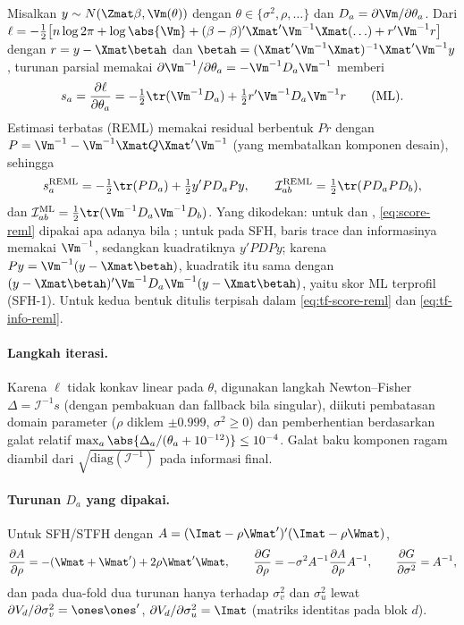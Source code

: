 Misalkan $y\sim N(\Zmat\beta,\Vm(\theta))$ dengan
$\theta\in\{\sigma^2,\rho,\ldots\}$ dan
$D_a=\partial\Vm/\partial\theta_a$. Dari
$\ell=-\tfrac12\bigl[n\log2\pi+\log\abs{\Vm}
+(\beta-\beta)'\Xmat'\Vm^{-1}\Xmat(\ldots)+r'\Vm^{-1}r\bigr]$ dengan
$r=y-\Xmat\betah$ dan
$\betah=(\Xmat'\Vm^{-1}\Xmat)^{-1}\Xmat'\Vm^{-1}y$, turunan parsial memakai
$\partial\Vm^{-1}/\partial\theta_a=-\Vm^{-1}D_a\Vm^{-1}$ memberi
\begin{equation}
  s_a=\frac{\partial\ell}{\partial\theta_a}
  =-\tfrac12\tr(\Vm^{-1}D_a)+\tfrac12 r'\Vm^{-1}D_a\Vm^{-1}r
  \qquad\text{(ML)}.
  \label{eq:score-ml}
\end{equation}
Estimasi terbatas (REML) memakai residual berbentuk
$P r$ dengan $P=\Vm^{-1}-\Vm^{-1}\Xmat Q\Xmat'\Vm^{-1}$ (yang membatalkan
komponen desain), sehingga
\begin{equation}
  s_a^{\text{REML}}
  =-\tfrac12\tr(P D_a)+\tfrac12 y'P D_a P y,
  \qquad
  \mathcal I_{ab}^{\text{REML}}=\tfrac12\tr(P D_a P D_b),
  \label{eq:score-reml}
\end{equation}
dan $\mathcal I_{ab}^{\text{ML}}=\tfrac12\tr(\Vm^{-1}D_a\Vm^{-1}D_b)$.
Yang dikodekan: untuk  dan ,
\eqref{eq:score-reml} dipakai apa adanya bila ;
untuk  pada SFH, baris trace dan informasinya memakai
$\Vm^{-1}$, sedangkan kuadratiknya $y'PDPy$; karena $Py=\Vm^{-1}(y-\Xmat\betah)$,
kuadratik itu sama dengan $(y-\Xmat\betah)'\Vm^{-1}D_a\Vm^{-1}(y-\Xmat\betah)$, yaitu skor
ML terprofil (SFH-1). Untuk  kedua bentuk ditulis
terpisah dalam \eqref{eq:tf-score-reml} dan \eqref{eq:tf-info-reml}.

\paragraph{Langkah iterasi.} Karena $\ell$ tidak konkav linear pada
$\theta$, digunakan langkah Newton--Fisher
$\Delta=\mathcal I^{-1}s$ (dengan pembakuan  dan fallback
 bila singular), diikuti pembatasan domain parameter
($\rho$ diklem $\pm0.999$, $\sigma^2\ge0$) dan pemberhentian berdasarkan
galat relatif $\max_a\abs{\Delta_a/(\theta_a+10^{-12})}\le10^{-4}$.
Galat baku komponen ragam diambil dari $\sqrt{\mathrm{diag}(\mathcal I^{-1})}$
pada informasi final.

\paragraph{Turunan $D_a$ yang dipakai.} Untuk SFH/STFH dengan
$A=(\Imat-\rho\Wmat')'(\Imat-\rho\Wmat)$,
\begin{equation}
  \frac{\partial A}{\partial\rho}=-(\Wmat+\Wmat')+2\rho\Wmat'\Wmat,
  \qquad
  \frac{\partial G}{\partial\rho}
  =-\sigma^2A^{-1}\frac{\partial A}{\partial\rho}A^{-1},
  \qquad
  \frac{\partial G}{\partial\sigma^2}=A^{-1},
  \label{eq:deriv-D}
\end{equation}
dan pada dua-fold dua turunan hanya terhadap $\sigma_v^2$ dan $\sigma_u^2$
lewat $\partial V_d/\partial\sigma_v^2=\ones\ones'$,
$\partial V_d/\partial\sigma_u^2=\Imat$ (matriks identitas pada blok $d$).

